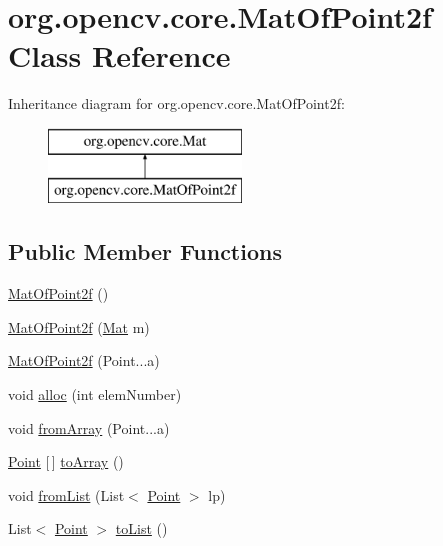 \hypertarget{classorg_1_1opencv_1_1core_1_1_mat_of_point2f}{}\section{org.\+opencv.\+core.\+Mat\+Of\+Point2f Class Reference}
\label{classorg_1_1opencv_1_1core_1_1_mat_of_point2f}
Inheritance diagram for org.\+opencv.\+core.\+Mat\+Of\+Point2f\+:\begin{figure}[H]
\begin{center}
\leavevmode
\includegraphics[height=2.000000cm]{classorg_1_1opencv_1_1core_1_1_mat_of_point2f}
\end{center}
\end{figure}
\subsection*{Public Member Functions}
\begin{DoxyCompactItemize}
\item 
\mbox{\hyperlink{classorg_1_1opencv_1_1core_1_1_mat_of_point2f_a77982ba187519a0263b6f0c3ea903f26}{Mat\+Of\+Point2f}} ()
\item 
\mbox{\hyperlink{classorg_1_1opencv_1_1core_1_1_mat_of_point2f_ae86d4be9b5cb05aae5056913f4f6c6da}{Mat\+Of\+Point2f}} (\mbox{\hyperlink{classorg_1_1opencv_1_1core_1_1_mat}{Mat}} m)
\item 
\mbox{\hyperlink{classorg_1_1opencv_1_1core_1_1_mat_of_point2f_acdca136fbc0e69c4fefa0d7aaa220c7b}{Mat\+Of\+Point2f}} (Point...\+a)
\item 
void \mbox{\hyperlink{classorg_1_1opencv_1_1core_1_1_mat_of_point2f_ad978c16f6d04d65d3c41224f63c0e2db}{alloc}} (int elem\+Number)
\item 
void \mbox{\hyperlink{classorg_1_1opencv_1_1core_1_1_mat_of_point2f_a0877604cae7952b97a1f92ad47e44329}{from\+Array}} (Point...\+a)
\item 
\mbox{\hyperlink{classorg_1_1opencv_1_1core_1_1_point}{Point}} \mbox{[}$\,$\mbox{]} \mbox{\hyperlink{classorg_1_1opencv_1_1core_1_1_mat_of_point2f_a2559332ee02731f4f54410416e498c3b}{to\+Array}} ()
\item 
void \mbox{\hyperlink{classorg_1_1opencv_1_1core_1_1_mat_of_point2f_a1d745b501bc06cb871c6e48d283dc3ac}{from\+List}} (List$<$ \mbox{\hyperlink{classorg_1_1opencv_1_1core_1_1_point}{Point}} $>$ lp)
\item 
List$<$ \mbox{\hyperlink{classorg_1_1opencv_1_1core_1_1_point}{Point}} $>$ \mbox{\hyperlink{classorg_1_1opencv_1_1core_1_1_mat_of_point2f_ab08d9dcb753d2d0db8d5c5d51f61fcf7}{to\+List}} ()
\end{DoxyCompactItemize}
